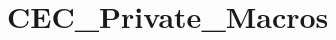 \hypertarget{group___c_e_c___private___macros}{}\section{C\+E\+C\+\_\+\+Private\+\_\+\+Macros}
\label{group___c_e_c___private___macros}
